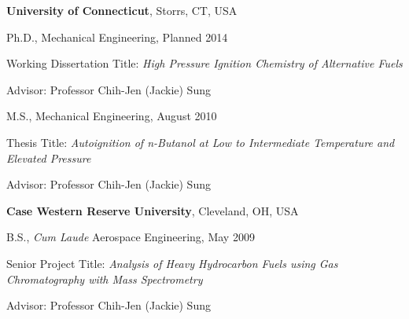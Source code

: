 \textbf{University of Connecticut}, Storrs, CT, USA
\begin{outerlist}

\item[] Ph.D., Mechanical Engineering, Planned 2014
        \begin{innerlist}
        \item[] Working Dissertation Title: \emph{High Pressure Ignition Chemistry of Alternative Fuels}
        \item[] Advisor: Professor Chih-Jen (Jackie) Sung
        \end{innerlist}

\item[] M.S., Mechanical Engineering, August 2010
        \begin{innerlist}
        \item[] Thesis Title: \emph{Autoignition of n-Butanol at Low to Intermediate Temperature and Elevated Pressure}
        \item[] Advisor: Professor Chih-Jen (Jackie) Sung
        \end{innerlist}

\end{outerlist}
\vspace{0.1in}
\textbf{Case Western Reserve University}, Cleveland, OH, USA
\begin{outerlist}

\item[] B.S., \emph{Cum Laude} Aerospace Engineering, May 2009
        \begin{innerlist}
        \item[] Senior Project Title: \emph{Analysis of Heavy Hydrocarbon Fuels using Gas Chromatography with Mass Spectrometry}
        \item[] Advisor: Professor Chih-Jen (Jackie) Sung
        \end{innerlist}

\end{outerlist}

%

